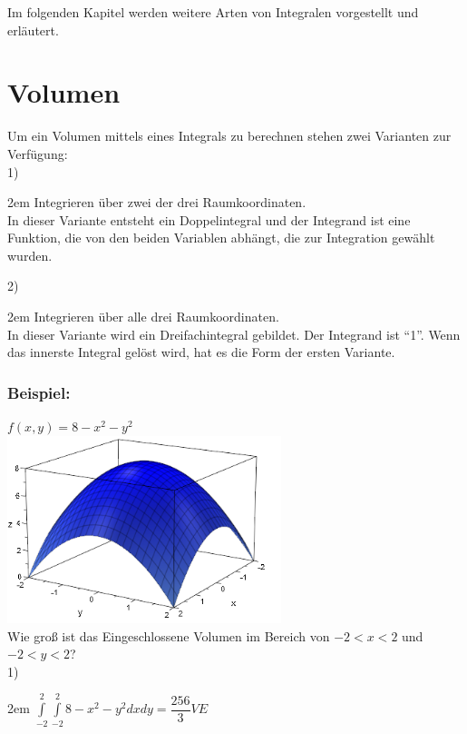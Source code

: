 \documentclass[11pt,final]{scrreprt}
\begin{document}
Im folgenden Kapitel werden weitere Arten von Integralen vorgestellt und erläutert. 

\section{Volumen}

Um ein Volumen mittels eines Integrals zu berechnen stehen zwei Varianten zur Verfügung:\\

1)

\begingroup
\leftskip2em 
Integrieren über zwei der drei Raumkoordinaten.\\
In dieser Variante entsteht ein Doppelintegral und der Integrand ist eine Funktion, die von den beiden Variablen abhängt, die zur Integration gewählt wurden. \\
\par	
\endgroup

2) 

\begingroup
\leftskip2em 
Integrieren über alle drei Raumkoordinaten.\\
In dieser Variante wird ein Dreifachintegral gebildet. Der Integrand ist ``1''. Wenn das innerste Integral gelöst wird, hat es die Form der ersten Variante.\\
\par	
\endgroup

\subsubsection{Beispiel:}
$ f(x, y) = 8-x^2-y^2 $\\
\includegraphics[width=8cm]{images/integrale/volumen1.png}\\
Wie groß ist das Eingeschlossene Volumen im Bereich von $-2<x<2$ und $-2<y<2$?\\

1)

\begingroup
\leftskip2em 
$ \int\limits_{-2}^{2}\int\limits_{-2}^{2} 8-x^2-y^2 dxdy = \dfrac{256}{3} VE$\\
\par	
\endgroup
\end{document}
